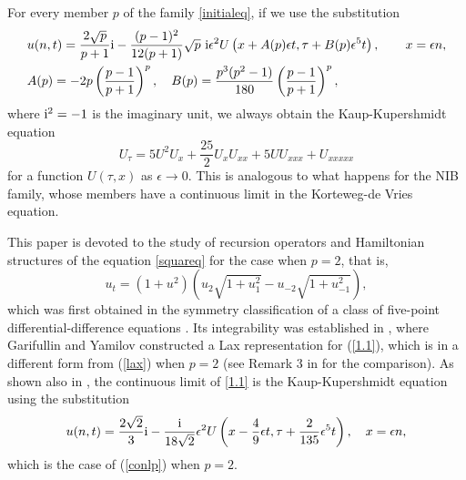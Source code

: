 \documentclass[fleqn,11pt,twoside]{article}
\theoremstyle{definition}
\begin{document}
For every member $p$ of the family \eqref{initialeq}, if we use the substitution
\begin{equation}\label{conlp}
 \begin{split}
  & u(n,t) = \frac{2 \sqrt{p}}{p+1}{\rm{i}} - \frac{(p-1)^2 }{12  (p+1)} \sqrt{p}\ {\rm{i}}\epsilon^2 U\left(x + A(p) \epsilon t, \tau + B(p) \epsilon^5 t\right),\qquad  x=\epsilon n, \\
  & A(p) = -2 p \left(\frac{p-1}{p+1}\right)^{p}, \quad  B(p) = \frac{p^3 (p^2-1)}{180}  \left(\frac{p-1}{p+1}\right)^{p},
 \end{split}
\end{equation}
where ${\rm i}^2=-1$ is the imaginary unit, we always obtain the Kaup-Kupershmidt
equation
\begin{equation*}
		U_\tau = 5 U^2 U_x + \frac{25}{2}  U_x U_{xx} + 5 U U_{xxx} +
U_{xxxxx}\label{KK}
	\end{equation*}
	for a function $U(\tau, x)$ as $\epsilon\rightarrow 0$. This is analogous to what happens for the NIB family, whose members have a continuous limit in the Korteweg-de Vries equation.

This paper is devoted to the study of recursion operators and Hamiltonian
structures of the equation \eqref{squareq} for the case when $p=2$, that is,
	\begin{equation}
		u_t =(1+u^2) (u_{2}
\sqrt{1+u_{1}^2}-u_{-2}\sqrt{1+u_{-1}^2}),
		\label{1.1}
	\end{equation}
which was first obtained in the symmetry classification of a class
of five-point differential-difference equations \cite{49}. Its integrability
was established
in \cite{50}, where Garifullin and Yamilov constructed a Lax representation for
(\ref{1.1}), which is in a different form from (\ref{lax}) when $p=2$ (see Remark
3 in \cite{15} for the comparison).
As shown also in \cite{50}, the continuous limit of \eqref{1.1} is the Kaup-Kupershmidt
equation using the substitution
\begin{equation*}
		u(n, t) = \frac{2\sqrt{2}}{3} {\rm{i}} - \frac{\rm{i}}{18
\sqrt{2}} \epsilon^2 U\left(x - \frac{4}{9} \epsilon t, \tau
+\frac{2}{135}\epsilon^5 t \right), \quad x=\epsilon n,
	\end{equation*}
which is the case of (\ref{conlp}) when $p=2$.
\end{document}
